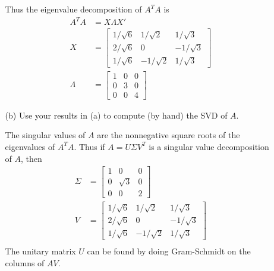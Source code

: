 \documentclass[11pt]{article}
\begin{document}
\begin{enumerate}
\begin{enumerate}
                Thus the eigenvalue decomposition of $A^T A$ is
                \begin{align*}
                    A^T A &= X \Lambda X' \\
                    X &=
                    \begin{bmatrix}
                        1/\sqrt{6} & 1/\sqrt{2}  & 1/\sqrt{3} \\
                        2/\sqrt{6} & 0           & -1/\sqrt{3} \\
                        1/\sqrt{6} & -1/\sqrt{2} & 1/\sqrt{3}
                    \end{bmatrix} \\
                    \Lambda &=
                    \begin{bmatrix}
                        1 & 0 & 0 \\
                        0 & 3 & 0 \\
                        0 & 0 & 4
                    \end{bmatrix}
                \end{align*}

            \item[(b)]
                Use your results in (a) to compute (by hand) the SVD of $A$.

                The singular values of $A$ are the nonnegative square roots of
                the eigenvalues of $A^T A$.
                Thus if $A = U \Sigma V^T$ is a singular value decomposition of
                $A$, then
                \begin{align*}
                    \Sigma &=
                    \begin{bmatrix}
                        1 & 0 & 0 \\
                        0 & \sqrt{3} & 0 \\
                        0 & 0 & 2
                    \end{bmatrix} \\
                    V &=
                    \begin{bmatrix}
                        1/\sqrt{6} & 1/\sqrt{2}  & 1/\sqrt{3} \\
                        2/\sqrt{6} & 0           & -1/\sqrt{3} \\
                        1/\sqrt{6} & -1/\sqrt{2} & 1/\sqrt{3}
                    \end{bmatrix} \\
                \end{align*}
                The unitary matrix $U$ can be found by doing
                Gram-Schmidt on the columns of $AV$.


\end{enumerate}
\end{enumerate}
\end{document}

